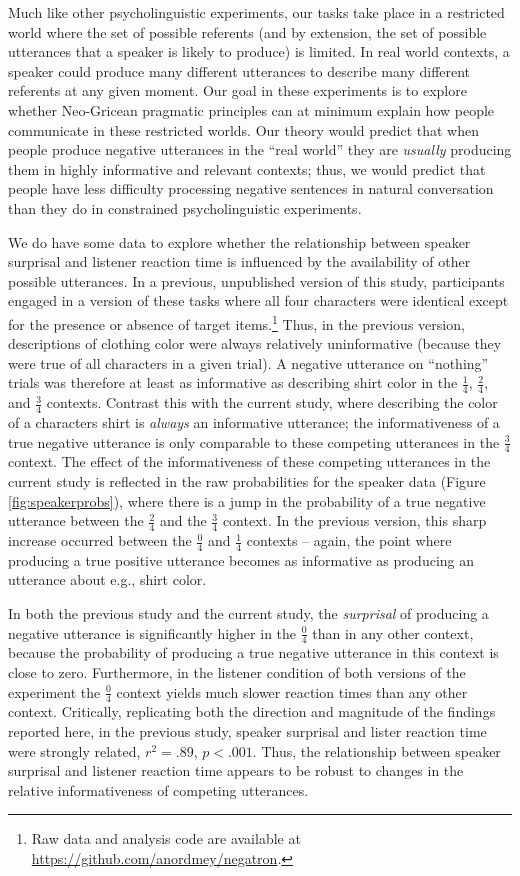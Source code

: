 \documentclass[man, noapacite]{apa2}
\begin{document}
Much like other psycholinguistic experiments, our tasks take place in a restricted world where the set of possible referents (and by extension, the set of possible utterances that a speaker is likely to produce) is limited. In real world contexts, a speaker could produce many different utterances to describe many different referents at any given moment. Our goal in these experiments is to explore whether Neo-Gricean pragmatic principles can at minimum explain how people communicate in these restricted worlds. Our theory would predict that when people produce negative utterances in the ``real world'' they are \emph{usually} producing them in highly informative and relevant contexts; thus, we would predict that people have less difficulty processing negative sentences in natural conversation than they do in constrained psycholinguistic experiments.

We do have some data to explore whether the relationship between speaker surprisal and listener reaction time is influenced by the availability of other possible utterances. In a previous, unpublished version of this study, participants engaged in a version of these tasks where all four characters were identical except for the presence or absence of target items.\footnote{Raw data and analysis code are available at \url{https://github.com/anordmey/negatron}.} Thus, in the previous version, descriptions of clothing color were always relatively uninformative (because they were true of all characters in a given trial). A negative utterance on ``nothing'' trials was therefore at least as informative as describing shirt color in the $\frac{1}{4}$, $\frac{2}{4}$, and $\frac{3}{4}$ contexts. Contrast this with the current study, where describing the color of a characters shirt is \emph{always} an informative utterance; the informativeness of a true negative utterance is only comparable to these competing utterances in the $\frac{3}{4}$ context. The effect of the informativeness of these competing utterances in the current study is reflected in the raw probabilities for the speaker data (Figure \ref{fig:speakerprobs}), where there is a jump in the probability of a true negative utterance between the $\frac{2}{4}$ and the $\frac{3}{4}$ context. In the previous version, this sharp increase occurred between the $\frac{0}{4}$ and $\frac{1}{4}$ contexts -- again, the point where producing a true positive utterance becomes as informative as producing an utterance about e.g., shirt color. 

In both the previous study and the current study, the \emph{surprisal} of producing a negative utterance is significantly higher in the $\frac{0}{4}$ than in any other context, because the probability of producing a true negative utterance in this context is close to zero. Furthermore, in the listener condition of both versions of the experiment the $\frac{0}{4}$ context yields much slower reaction times than any other context. Critically, replicating both the direction and magnitude of the findings reported here, in the previous study, speaker surprisal and lister reaction time were strongly related, $r^2=.89$, $p<.001$. Thus, the relationship between speaker surprisal and listener reaction time appears to be robust to changes in the relative informativeness of competing utterances. 
\end{document}
